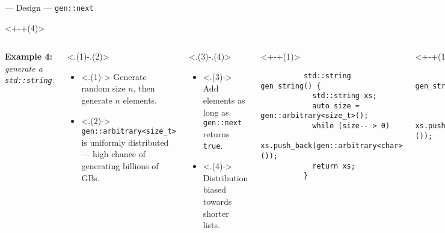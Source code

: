 \begin{frame}[fragile,t]{\halcheck{} --- Design --- \texttt{gen::next}}
  \begin{onlyenv}<+-+(4)>
    \begin{columns}[T]
      \textbf{Example 4:} \emph{generate a \texttt{std::string}}.

      \begin{onlyenv}<.(1)-.(2)>
        \begin{itemize}
          \item<.(1)-> Generate random size $n$, then generate $n$ elements.
          \item<.(2)-> \texttt{gen::arbitrary<size_t>} is uniformly distributed --- high chance of generating \alert{billions of GBs}.
        \end{itemize}
      \end{onlyenv}

      \begin{onlyenv}<.(3)-.(4)>
        \begin{itemize}
          \item<.(3)-> Add elements as long as \texttt{gen::next} returns \texttt{true}.
          \item<.(4)-> Distribution \alert{biased towards shorter lists}.
        \end{itemize}
      \end{onlyenv}

      \begin{onlyenv}<+-+(1)>
        \begin{verbatim}
          std::string gen_string() {
            std::string xs;
            auto size = gen::arbitrary<size_t>();
            while (size-- > 0)
              xs.push_back(gen::arbitrary<char>());
            return xs;
          }
        \end{verbatim}
        \only<+>{}
      \end{onlyenv}

      \begin{onlyenv}<+-+(1)>
        \begin{verbatim}
          std::string gen_string() {
            std::string xs;
            while (gen::next())
              xs.push_back(gen::arbitrary<char>());
            return xs;
          }
        \end{verbatim}
        \only<+>{}
      \end{onlyenv}

    \end{columns}
  \end{onlyenv}
\end{frame}


